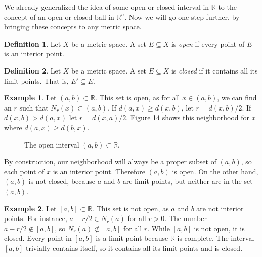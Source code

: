 \documentclass{article}
\newcommand{\R}{\mathbb{R}}
\theoremstyle{definition}
\newtheorem{definition}{Definition}[section]
\newtheorem{example}{Example}[section]
\begin{document}
We already generalized the idea of some open or closed interval in $ \R $ to the concept of an open or closed ball in $ \R^n $. Now we will go one step further, by bringing these concepts to any metric space. 
\begin{definition}
	Let $ X $ be a metric space. A set $ E\subseteq X $ is \textit{\color{red}open} if every point of $ E $ is an interior point.  
\end{definition}
\begin{definition}
	Let $ X $ be a metric space. A set $ E\subseteq X $ is \textit{\color{red}closed} if it contains all its limit points. That is, $ E'\subseteq E $. 
\end{definition}
\begin{example}
	Let $ (a,b)\subset\R $. This set is open, as for all $ x\in(a,b) $, we can find an $ r $ such that $ N_r(x)\subset(a,b) $. If $ d(a,x)\ge d(x,b) $, let $ r=d(x,b)/2 $. If $ d(x,b)>d(a,x) $ let $ r=d(x,a)/2 $.  Figure 14 shows this neighborhood for $ x $ where $ d(a,x)\ge d(b,x) $.
		\begin{figure}[h]
		\centering
		\caption{The open interval $ (a,b)\subset \R $.}
	\end{figure}
By construction, our neighborhood will always be a proper subset of $ (a,b) $, so each point of $ x $ is an interior point. Therefore $ (a,b) $ is open. On the other hand, $ (a,b) $ is not closed, because $ a $ and $ b $ are limit points, but neither are in the set $ (a,b) $.
\end{example}
\begin{example}
	Let $ [a,b]\subset\R $. This set is not open, as $ a $ and $ b $ are not interior points. For instance, $ a-r/2\in N_r(a) $ for all $ r>0 $. The number $ a-r/2\notin[a,b] $, so $ N_r(a)\not\subset[a,b] $ for all $ r $. While $ [a,b] $ is not open, it is closed. Every point in $ [a,b] $ is a limit point because $ \R $ is complete. The interval $ [a,b] $ trivially contains itself, so it contains all its limit points and is closed. 
\end{example}
\end{document}
